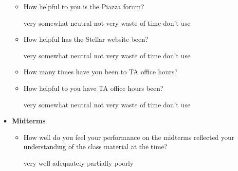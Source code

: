 \documentclass[handout]{mcs}
\begin{document}
\begin{itemize}
\begin{itemize}
\item How helpful to you is the Piazza forum?

\begin{center}
very\hspace{0.3in} somewhat \hspace{0.3in} neutral\hspace{0.3in} not
very \hspace{0.3in} waste of time  \hspace{0.7in}don't use
\end{center}


\item How helpful has the Stellar website been?

\begin{center}
very\hspace{0.3in} somewhat \hspace{0.3in} neutral\hspace{0.3in} not
very \hspace{0.3in} waste of time  \hspace{0.7in}don't use
\end{center}


\item How many times have you been to TA office hours?\brule{0.7in}


\item How helpful to you have TA office hours been?
 
\begin{center}
very\hspace{0.3in} somewhat \hspace{0.3in} neutral\hspace{0.3in} not
very \hspace{0.3in} waste of time  \hspace{0.7in}don't use
\end{center}

\end{itemize}

\item \textbf{Midterms}

\begin{itemize}

\item How well do you feel your performance on the midterms
  reflected your understanding of the class material at the time?

\begin{center}
very well\hspace{0.3in} adequately\hspace{0.3in} partially\hspace{0.3in} poorly
\end{center}


\end{itemize}
\end{itemize}
\end{document}
